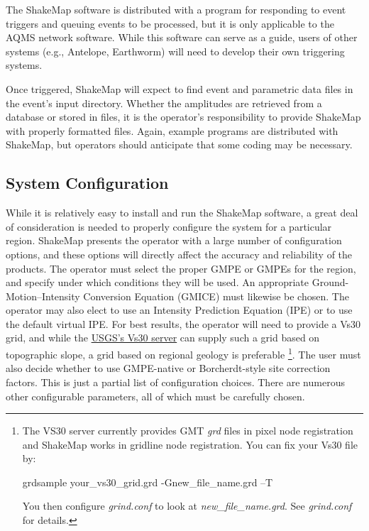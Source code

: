 \documentclass[letterpaper,10pt,english]{sphinxmanual}
\begin{document}
The ShakeMap software is distributed with a program for responding to event triggers
and queuing events to be processed, but it is only applicable to the AQMS network
software. While this software can serve as a guide, users of other systems (e.g., Antelope,
Earthworm) will need to develop their own triggering systems.

Once triggered, ShakeMap will expect to find event and parametric data files in the
event's input directory. Whether the amplitudes are retrieved from a database or stored in
files, it is the operator's responsibility to provide ShakeMap with properly formatted
files. Again, example programs are distributed with ShakeMap, but operators should
anticipate that some coding may be necessary.


\subsection{System Configuration}
\label{software_guide:system-configuration}
While it is relatively easy to install and run the ShakeMap software, a great deal of
consideration is needed to properly configure the system for a particular region.
ShakeMap presents the operator with a large number of configuration options, and these
options will directly affect the accuracy and reliability of the products. The
operator must select the proper GMPE or GMPEs for the region, and specify under which
conditions they will be used. An appropriate Ground-Motion--Intensity Conversion
Equation (GMICE) must likewise be chosen. The operator may also elect to use an Intensity
Prediction Equation (IPE) or to use the default virtual IPE. For best results, the operator
will need to provide a Vs30 grid, and while the \href{http://earthquake.usgs.gov/hazards/apps/vs30/}{USGS's Vs30 server} can supply such a
grid based on topographic slope, a grid based on regional geology is preferable \footnote[1]{\sphinxAtStartFootnote%
The VS30 server currently provides GMT \emph{grd} files in pixel node registration and
ShakeMap works in gridline node registration. You can fix your Vs30 file by:

grdsample your\_vs30\_grid.grd -Gnew\_file\_name.grd –T

You then configure \emph{grind.conf} to look at \emph{new\_file\_name.grd}.
See \emph{grind.conf} for details.
}. The
user must also decide whether to use GMPE-native or Borcherdt-style site correction
factors. This is just a partial list of configuration choices. There are numerous other
configurable parameters, all of which must be carefully chosen.
\end{document}
